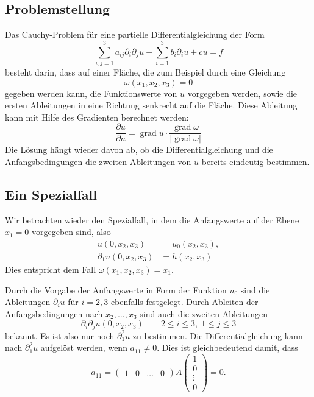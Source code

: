 \subsection{Problemstellung}
Das Cauchy-Problem für eine partielle Differentialgleichung der
Form
\[
\sum_{i,j=1}^3a_{ij}\partial_i\partial_ju+\sum_{i=1}^3b_i\partial_iu+cu=f
\]
besteht darin, dass auf einer Fläche, die zum Beispiel durch
eine Gleichung
\[
\omega(x_1,x_2,x_3)=0
\]
gegeben werden kann,
die Funktionswerte von $u$ vorgegeben werden, sowie die ersten
Ableitungen in eine Richtung senkrecht auf die Fläche.
Diese Ableitung kann mit Hilfe des Gradienten berechnet werden:
\[
\frac{\partial u}{\partial n}=\operatorname{grad}u\cdot \frac{\operatorname{grad}\omega}{|\operatorname{grad}\omega|}
\]
Die Lösung hängt wieder davon ab, ob die Differentialgleichung
und die Anfangsbedingungen die zweiten Ableitungen von $u$ bereits
eindeutig bestimmen.

\subsection{Ein Spezialfall}
Wir betrachten wieder den Spezialfall, in dem die Anfangswerte auf der
Ebene $x_1=0$ vorgegeben sind, also
\begin{align*}
u(0,x_2,x_3)&=u_0(x_2,x_3),
\\
\partial_1u(0,x_2,x_3)&=h(x_2,x_3)
\end{align*}
Dies entspricht dem Fall $\omega(x_1,x_2,x_3)=x_1$.

Durch die Vorgabe der Anfangswerte in Form der Funktion $u_0$ sind die Ableitungen
$\partial_iu$ für $i=2,3$ ebenfalls festgelegt.
Durch Ableiten der Anfangsbedingungen nach $x_2,\dots,x_3$
sind auch die zweiten Ableitungen 
\[
\partial_i\partial_ju(0,x_2,x_3)\qquad 2\le i\le 3,\;1\le j\le 3
\]
bekannt. Es ist also nur noch $\partial_1^2u$ zu bestimmen.
Die Differentialgleichung kann nach $\partial_1^2u$ aufgelöst
werden, wenn $a_{11}\ne 0$. Dies ist gleichbedeutend damit, dass
\[
a_{11}=\begin{pmatrix}
1&0&\dots&0
\end{pmatrix}
A
\begin{pmatrix}1\\0\\\vdots\\0\end{pmatrix}
=0.
\]

